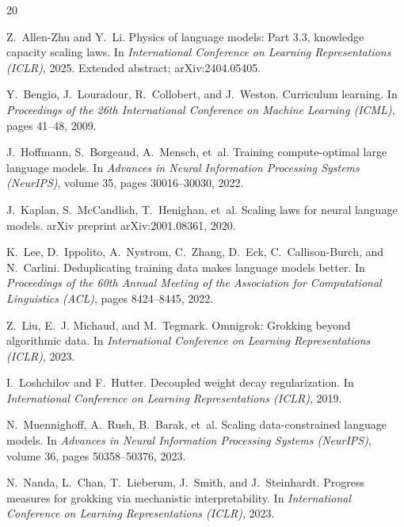 \documentclass[10pt]{article}
\begin{document}

\begin{thebibliography}{20}

Z.~Allen-Zhu and Y.~Li.
\newblock Physics of language models: Part 3.3, knowledge capacity scaling laws.
\newblock In \emph{International Conference on Learning Representations (ICLR)}, 2025.
\newblock Extended abstract; arXiv:2404.05405.

Y.~Bengio, J.~Louradour, R.~Collobert, and J.~Weston.
\newblock Curriculum learning.
\newblock In \emph{Proceedings of the 26th International Conference on Machine Learning (ICML)}, pages 41--48, 2009.

J.~Hoffmann, S.~Borgeaud, A.~Mensch, et~al.
\newblock Training compute-optimal large language models.
\newblock In \emph{Advances in Neural Information Processing Systems (NeurIPS)}, volume 35, pages 30016--30030, 2022.

J.~Kaplan, S.~McCandlish, T.~Henighan, et~al.
\newblock Scaling laws for neural language models.
\newblock arXiv preprint arXiv:2001.08361, 2020.

K.~Lee, D.~Ippolito, A.~Nystrom, C.~Zhang, D.~Eck, C.~Callison-Burch, and N.~Carlini.
\newblock Deduplicating training data makes language models better.
\newblock In \emph{Proceedings of the 60th Annual Meeting of the Association for Computational Linguistics (ACL)}, pages 8424--8445, 2022.

Z.~Liu, E.~J. Michaud, and M.~Tegmark.
\newblock Omnigrok: Grokking beyond algorithmic data.
\newblock In \emph{International Conference on Learning Representations (ICLR)}, 2023.

I.~Loshchilov and F.~Hutter.
\newblock Decoupled weight decay regularization.
\newblock In \emph{International Conference on Learning Representations (ICLR)}, 2019.

N.~Muennighoff, A.~Rush, B.~Barak, et~al.
\newblock Scaling data-constrained language models.
\newblock In \emph{Advances in Neural Information Processing Systems (NeurIPS)}, volume 36, pages 50358--50376, 2023.

N.~Nanda, L.~Chan, T.~Lieberum, J.~Smith, and J.~Steinhardt.
\newblock Progress measures for grokking via mechanistic interpretability.
\newblock In \emph{International Conference on Learning Representations (ICLR)}, 2023.


\end{thebibliography}
\end{document}
